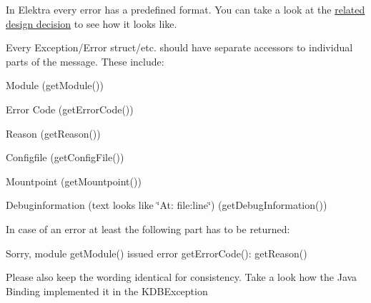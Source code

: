 In Elektra every error has a predefined format. You can take a look at the \hyperlink{doc_decisions_error_message_format_md}{related design decision} to see how it looks like.

Every Exception/\+Error struct/etc. should have separate accessors to individual parts of the message. These include\+:


\begin{DoxyEnumerate}
\item Module (get\+Module())
\item Error Code (get\+Error\+Code())
\item Reason (get\+Reason())
\item Configfile (get\+Config\+File())
\item Mountpoint (get\+Mountpoint())
\item Debuginformation (text looks like \char`\"{}\+At\+: file\+:line\char`\"{}) (get\+Debug\+Information())
\end{DoxyEnumerate}

In case of an error at least the following part has to be returned\+:


\begin{DoxyCode}
Sorry, module getModule() issued error getErrorCode():
getReason()
\end{DoxyCode}


Please also keep the wording identical for consistency. Take a look how the Java Binding implemented it in the K\+D\+B\+Exception 